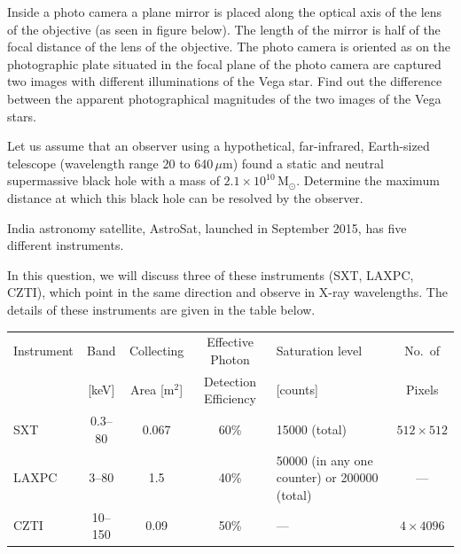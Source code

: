 Inside a photo camera a plane mirror is placed along the optical axis of the
lens of the objective (as seen in figure below). The length of the mirror is
half of the focal distance of the lens of the objective. The photo camera is
oriented as on the photographic plate situated in the focal plane of the photo
camera are captured two images with different illuminations of the Vega star.
Find out the difference between the apparent photographical magnitudes of the
two images of the Vega stars.


Let us assume that an observer using a hypothetical, far-infrared, Earth-sized
telescope (wavelength range 20 to 640\,$\mu$m) found a static and neutral
supermassive black hole with a mass of $2.1 \times 10^{10}\,\mathrm{M}_\odot$.
Determine the maximum distance at which this black hole can be resolved by the
observer.

India astronomy satellite, AstroSat, launched in September 2015, has five
different instruments.


In this question, we will discuss three of these instruments (SXT, LAXPC,
CZTI), which point in the same direction and observe in X-ray wavelengths. The
details of these instruments are given in the table below.

\begin{center}
\small
\begin{tabular}{|l|c|c|c|p{3.2cm}|c|}
\hline
Instrument & Band & Collecting & Effective Photon & Saturation level & No.\ of
\\
 & [keV] & Area [m$^2$] & Detection Efficiency & [counts] & Pixels \\
\hline
SXT & 0.3--80 & 0.067 & 60\% & 15000 (total) & $512 \times 512$ \\
\hline
LAXPC & 3--80 & 1.5 & 40\% & 50000 (in any one counter) or 200000 (total)
  & --- \\
\hline
CZTI & 10--150 & 0.09 & 50\% & --- & $4 \times 4096$ \\
\hline
\end{tabular}
\end{center}

